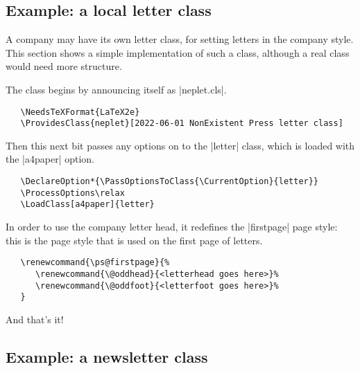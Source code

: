 \documentclass{ltxguide}
\begin{document}
\subsection{Example: a local letter class}

A company may have its own letter class, for setting letters in the
company style.  This section shows a simple implementation of such a
class, although a real class would need more structure.

The class begins by announcing itself as |neplet.cls|.
\begin{verbatim}
   \NeedsTeXFormat{LaTeX2e}
   \ProvidesClass{neplet}[2022-06-01 NonExistent Press letter class]
\end{verbatim}
Then this next bit passes any options on to the |letter| class, which is loaded
with the |a4paper| option.
\begin{verbatim}
   \DeclareOption*{\PassOptionsToClass{\CurrentOption}{letter}}
   \ProcessOptions\relax
   \LoadClass[a4paper]{letter}
\end{verbatim}
In order to use the company letter head, it redefines the |firstpage| page
style: this is the page style that is used on the first page of letters.
\begin{verbatim}
   \renewcommand{\ps@firstpage}{%
      \renewcommand{\@oddhead}{<letterhead goes here>}%
      \renewcommand{\@oddfoot}{<letterfoot goes here>}%
   }
\end{verbatim}
And that's it!

\subsection{Example: a newsletter class}
\end{document}
